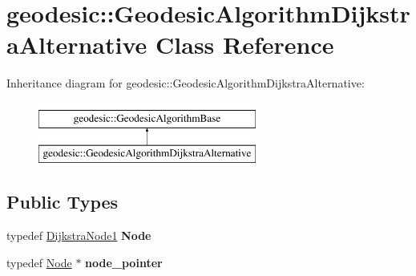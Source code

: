 \hypertarget{classgeodesic_1_1_geodesic_algorithm_dijkstra_alternative}{}\section{geodesic\+:\+:Geodesic\+Algorithm\+Dijkstra\+Alternative Class Reference}
\label{classgeodesic_1_1_geodesic_algorithm_dijkstra_alternative}
Inheritance diagram for geodesic\+:\+:Geodesic\+Algorithm\+Dijkstra\+Alternative\+:\begin{figure}[H]
\begin{center}
\leavevmode
\includegraphics[height=2.000000cm]{classgeodesic_1_1_geodesic_algorithm_dijkstra_alternative}
\end{center}
\end{figure}
\subsection*{Public Types}
\begin{DoxyCompactItemize}
\item 
\hypertarget{classgeodesic_1_1_geodesic_algorithm_dijkstra_alternative_a6cc60d726839ec193d276fa7fe71a8a0}{}typedef \hyperlink{classgeodesic_1_1_dijkstra_node1}{Dijkstra\+Node1} {\bfseries Node}\label{classgeodesic_1_1_geodesic_algorithm_dijkstra_alternative_a6cc60d726839ec193d276fa7fe71a8a0}

\item 
\hypertarget{classgeodesic_1_1_geodesic_algorithm_dijkstra_alternative_a7248597bed80fb5fd1bcd6c794be49c6}{}typedef \hyperlink{classgeodesic_1_1_dijkstra_node1}{Node} $\ast$ {\bfseries node\+\_\+pointer}\label{classgeodesic_1_1_geodesic_algorithm_dijkstra_alternative_a7248597bed80fb5fd1bcd6c794be49c6}

\end{DoxyCompactItemize}

